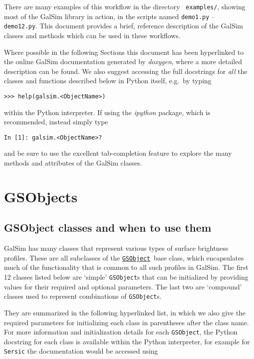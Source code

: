 \documentclass[preprint,10pt]{../../devel/modules/aastex}
\newcommand\GSObject{\href{http://galsim-developers.github.io/GalSim/classgalsim_1_1base_1_1_g_s_object.html}{\texttt{GSObject}}}
\begin{document}
There are many examples of this workflow in the directory {\tt
 examples/}, showing most of the GalSim library in action, in
the scripts named \texttt{demo1.py} -- \texttt{demo12.py}.  This
document provides a brief, reference description of the GalSim classes
and methods which can be used in these workflows.

Where possible in the following Sections this document has been hyperlinked to the online
GalSim documentation generated by \emph{doxygen}, where a more detailed
description can be found.  We also suggest accessing the full docstrings for \emph{all} the
classes and functions described below in Python itself, e.g.\ by typing

\texttt{>>> help(galsim.<ObjectName>)}

within the Python interpreter.  If using the \emph{ipython} package,
which is recommended, instead simply type

\texttt{In [1]: galsim.<ObjectName>?}

and be sure to use the excellent tab-completion feature to explore the many
methods and attributes of the GalSim classes.


\section{GSObjects}\label{sect:gsobjects}

\subsection{GSObject classes and when to use them}\label{sect:gsobjectclasses}
GalSim has many classes that represent various types of surface brightness profiles.
These are all subclasses of the \GSObject\ base class, which encapsulates
much of the functionality that is common to all such profiles in GalSim.
The first 12 classes listed below are
`simple' \texttt{GSObject}s that can be initialized by providing
values for their required and optional parameters.  The last two are
`compound' classes used to represent combinations of
\texttt{GSObject}s.

They are summarized in the following hyperlinked list, in which we also give
the required parameters for initializing each class in parentheses
after the class name.  For more information and initialization details for each \texttt{GSObject},
the Python docstring for each class is available within the Python interpreter, for example for
\texttt{Sersic} the documentation would be accessed using
\end{document}
